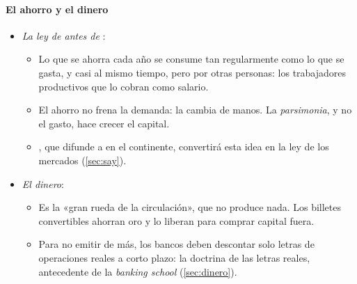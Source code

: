 \documentclass[11pt]{article}
\begin{document}
\paragraph{El ahorro y el dinero}\label{sec:smith-say}
\begin{itemize}
\item \emph{La ley de  antes de }:
  \begin{itemize}
  \item Lo que se ahorra cada año se consume tan regularmente como lo que se gasta, y casi al mismo tiempo, pero por otras personas: los trabajadores productivos que lo cobran como salario\nocite{Smith1776Wealth}.
  \item El ahorro no frena la demanda: la cambia de manos. La \emph{parsimonia}, y no el gasto, hace crecer el capital.
  \item {}, que difunde a  en el continente, convertirá esta idea en la ley de los mercados (\ref{sec:say}).
  \end{itemize}
\item \emph{El dinero}:
  \begin{itemize}
  \item Es la «gran rueda de la circulación», que no produce nada. Los billetes convertibles ahorran oro y lo liberan para comprar capital fuera.
  \item Para no emitir de más, los bancos deben descontar solo letras de operaciones reales a corto plazo: la doctrina de las letras reales, antecedente de la \emph{banking school}\nocite{Smith1776Wealth} (\ref{sec:dinero}).
  \end{itemize}
\end{itemize}
\end{document}
